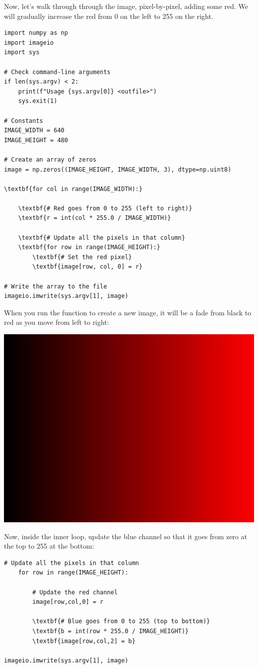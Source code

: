 Now, let's walk through through the image, pixel-by-pixel, adding some
red. We will gradually increase the red from 0 on the left to 255 on
the right.

\begin{Verbatim}[commandchars=\\\{\}]
import numpy as np
import imageio
import sys

# Check command-line arguments
if len(sys.argv) < 2:
    print(f"Usage {sys.argv[0]} <outfile>")
    sys.exit(1)

# Constants
IMAGE_WIDTH = 640
IMAGE_HEIGHT = 480

# Create an array of zeros
image = np.zeros((IMAGE_HEIGHT, IMAGE_WIDTH, 3), dtype=np.uint8)

\textbf{for col in range(IMAGE_WIDTH):}

    \textbf{# Red goes from 0 to 255 (left to right)}
    \textbf{r = int(col * 255.0 / IMAGE_WIDTH)}

    \textbf{# Update all the pixels in that column}
    \textbf{for row in range(IMAGE_HEIGHT):}
        \textbf{# Set the red pixel}
        \textbf{image[row, col, 0] = r}

# Write the array to the file
imageio.imwrite(sys.argv[1], image)
\end{Verbatim}

When you run the function to create a new image, it will be a fade
from black to red as you move from left to right:

\includegraphics[width=0.4\linewidth]{red.png}

Now, inside the inner loop, update the blue channel so that it goes
from zero at the top to 255 at the bottom:

\begin{Verbatim}[commandchars=\\\{\}]
    # Update all the pixels in that column
    for row in range(IMAGE_HEIGHT):

        # Update the red channel
        image[row,col,0] = r
        
        \textbf{# Blue goes from 0 to 255 (top to bottom)}
        \textbf{b = int(row * 255.0 / IMAGE_HEIGHT)}
        \textbf{image[row,col,2] = b}

imageio.imwrite(sys.argv[1], image)
\end{Verbatim}

